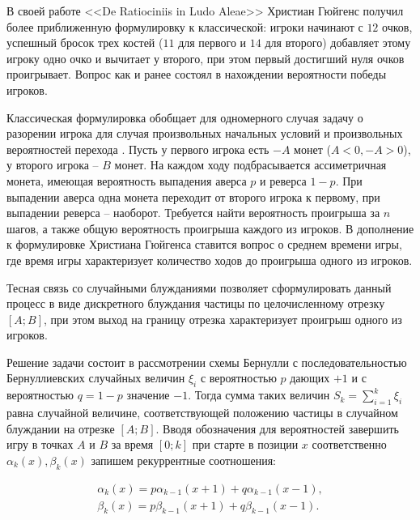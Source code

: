 В своей работе <<De Ratiociniis in Ludo Aleae>> Христиан Гюйгенс \cite{hald_history_2003, huygens_christiani_1714} получил более приближенную формулировку к классической: 
игроки начинают с $12$ очков, успешный бросок  трех костей ($11$ для первого и $14$ для второго) добавляет этому игроку одно очко и вычитает у второго, 
при этом первый достигший нуля очков проигрывает. Вопрос как и ранее состоял в нахождении вероятности победы игроков. 

Классическая формулировка обобщает для одномерного случая задачу о разорении игрока для случая произвольных начальных условий и произвольных вероятностей перехода \cite{feller_introduction_1968}. 
Пусть у первого игрока есть $-A$ монет ($A < 0, -A > 0$), у второго игрока -- $B$ монет. На каждом ходу подбрасывается ассиметричная монета, имеющая вероятность выпадения 
аверса $p$ и реверса $1-p$. При выпадении аверса одна монета переходит от второго игрока к первому, при выпадении реверса -- наоборот. Требуется найти вероятность проигрыша 
за $n$ шагов, а также общую вероятность проигрыша каждого из игроков. В дополнение к формулировке Христиана Гюйгенса ставится вопрос о среднем времени игры, 
где время игры характеризует количество ходов до проигрыша одного из игроков.

Тесная связь со случайными блужданиями позволяет сформулировать данный процесс в виде дискретного блуждания частицы по целочисленному отрезку $[A; B]$, 
при этом выход на границу отрезка характеризует проигрыш одного из игроков. \cite{shiryaev_2021} 

Решение задачи состоит в рассмотрении схемы Бернулли с последовательностью Бернуллиевских случайных величин $\xi_i$ с вероятностью $p$ дающих $+1$ и 
с вероятностью $q=1-p$ значение $-1$.
Тогда сумма таких величин $S_k=\sum_{i=1}^{k} \xi_i$ равна случайной величине, соответствующей положению частицы в случайном блуждании на отрезке $[A; B]$.
Вводя обозначения для вероятностей завершить игру в точках $A$ и $B$ за время $[0; k]$ при старте в позиции $x$ соответственно $\alpha_k(x), \beta_k(x)$ 
запишем рекуррентные соотношения:

\begin{equation}
    \label{eq:eq1}
    \begin{alignedat}{2}
        \alpha_k(x) = p\alpha_{k-1}(x+1)+q\alpha_{k-1}(x-1),\\
        \beta_k(x) = p\beta_{k-1}(x+1)+q\beta_{k-1}(x-1).
    \end{alignedat}
\end{equation}

